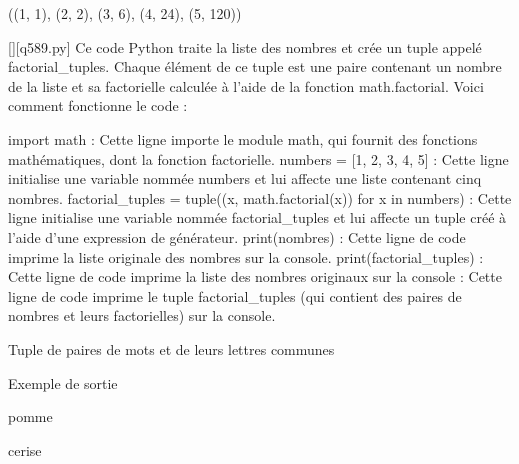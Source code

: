 ((1, 1), (2, 2), (3, 6), (4, 24), (5, 120))
        \par
        \begin{solution}
            \renewcommand{\nomfichier}{q589.py}
            \pythonfile{\chemincode \nomfichier}[][\nomfichier]
            Ce code Python traite la liste des nombres et crée un tuple appelé factorial_tuples. Chaque élément de ce tuple est une paire contenant un nombre de la liste et sa factorielle calculée à l'aide de la fonction math.factorial. Voici comment fonctionne le code :

    import math : Cette ligne importe le module math, qui fournit des fonctions mathématiques, dont la fonction factorielle.
    numbers = [1, 2, 3, 4, 5] : Cette ligne initialise une variable nommée numbers et lui affecte une liste contenant cinq nombres.
    factorial_tuples = tuple((x, math.factorial(x)) for x in numbers) : Cette ligne initialise une variable nommée factorial_tuples et lui affecte un tuple créé à l'aide d'une expression de générateur.
    print(nombres) : Cette ligne de code imprime la liste originale des nombres sur la console.
    print(factorial_tuples) : Cette ligne de code imprime la liste des nombres originaux sur la console : Cette ligne de code imprime le tuple factorial_tuples (qui contient des paires de nombres et leurs factorielles) sur la console.
        \end{solution}
        

        \question
        Tuple de paires de mots et de leurs lettres communes

Exemple de sortie

pomme

cerise

